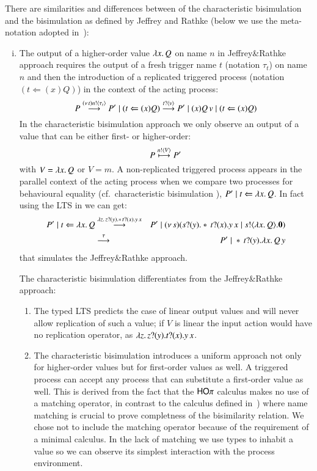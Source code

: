 There are similarities and differences between of the characteristic bisimulation
and the bisimulation as defined by Jeffrey and Rathke
(below we use the meta-notation adopted in~\cite{JeffreyR05}):
%
\begin{enumerate}[i)]
	\item	The output of a higher-order value $\lambda x.\,Q$ on name
		$n$ in Jeffrey\&Rathke approach requires the output of
		a fresh trigger name $t$ (notation $\tau_t$)
		on name $n$ 
		and then the introduction of a replicated triggered process
		(notation $(t \Leftarrow (x) Q)$)
		in the context of the acting process:
		\[
			P \stackrel{(\nu\, t) n ! \langle \tau_{t} \rangle}{\longrightarrow} P' \;|\; (t \Leftarrow (x) Q) \stackrel{t ? \langle v \rangle}{\longrightarrow} P' \;|\; (x) Q\, {v} \;|\; (t \Leftarrow (x) Q) 
		\]
		In the characteristic bisimulation approach we only observe
		an output of a value that can be either first- or higher-order:
		\[
			P \stackrel{n ! \langle V \rangle}{\longmapsto} P' 
		\]
		with $V = \lambda x.\,Q$ or $V = m$.
		A non-replicated triggered process appears in
		the parallel context of the acting process when
		we compare two processes for behavioural equality
		(cf.~characteristic bisimulation ),
		$P' \;|\; t \Leftarrow \lambda x.\,Q$.
		In fact using the LTS in
		 we can get:
		\begin{eqnarray*}
			P' \;|\; t \Leftarrow \lambda x.\,Q
			&\stackrel{\lambda z.\,z ? (y) . \ast\,{} t ? (x) . y\, {x}}{\longrightarrow}&
			P' \;|\; (\nu\, s)(s ? (y) . \ast\,{} t ? (x) . y\, {x} \;|\; s ! \langle \lambda x.\,Q \rangle . \mathbf{0})\\
			&\stackrel{\tau}{\longrightarrow}&
			P' \;|\; \ast\,{}t ? (y) . \lambda x.\,Q\, {y}
		\end{eqnarray*}
		that simulates the Jeffrey\&Rathke approach.

		The characteristic bisimulation differentiates from
		the Jeffrey\&Rathke approach:
		\begin{enumerate}[$\bullet$]
			\item	The typed LTS predicts the case of linear
				output values and will never allow replication
				of such a value;
				if $V$ is linear the input action would have no replication
				operator, as
				$\lambda z.\,z ? (y) . t ? (x) . y\, {x}$.

			\item	The characteristic bisimulation introduces a uniform approach
				not only for
				higher-order values but for first-order values
				as well. A triggered process can accept any
				process that can substitute a first-order value as well.
				This is derived from the fact that the $\mathsf{HO}\pi$
				calculus makes no use of a matching operator, in contrast
				to the calculus defined in~\cite{JeffreyR05})
				where name matching is crucial to prove completness
				of the bisimilarity relation.
				We chose not to include the matching operator
				because of the requirement of a minimal calculus.
				In the lack of matching we use types to inhabit
				a value so we can observe its simplest interaction
				with the process environment.


\end{enumerate}
\end{enumerate}
